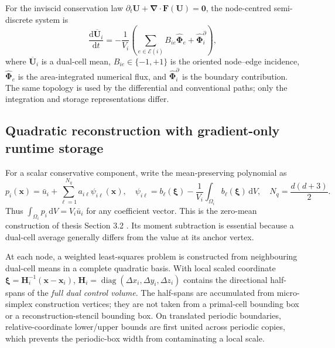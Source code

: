 \documentclass[11pt]{article}
\newcommand{\U}{\bm{U}}
\newcommand{\F}{\bm{F}}
\newcommand{\grad}{\bm{\nabla}}
\newcommand{\dd}{\mathrm{d}}
\begin{document}
For the inviscid conservation law $\partial_t\U+\grad\cdot\F(\U)=\bm{0}$, the node-centred semi-discrete system is
\begin{equation}
 \frac{\dd\overline{\U}_i}{\dd t}
 =-\frac{1}{V_i}\left(\sum_{e\in\mathcal{E}(i)}B_{ie}\widehat{\bm\Phi}_e
 +\widehat{\bm\Phi}^{\partial}_i\right),
 \label{eq:semidiscrete}
\end{equation}
where $\overline{\U}_i$ is a dual-cell mean, $B_{ie}\in\{-1,+1\}$ is the oriented node--edge incidence, $\widehat{\bm\Phi}_e$ is the area-integrated numerical flux, and $\widehat{\bm\Phi}^{\partial}_i$ is the boundary contribution.  The same topology is used by the differential and conventional paths; only the integration and storage representations differ.

\subsection{Quadratic reconstruction with gradient-only runtime storage}\label{sec:recon}

For a scalar conservative component, write the mean-preserving polynomial as
\begin{equation}
 p_i(\bm x)=\bar u_i+\sum_{\ell=1}^{N_q}a_{i\ell}\psi_{i\ell}(\bm x),
 \quad
 \psi_{i\ell}=b_\ell(\bm\xi)-\frac{1}{V_i}\int_{\Omega_i}b_\ell(\bm\xi)\,\dd V,
 \quad N_q=\frac{d(d+3)}{2}.
 \label{eq:zero-mean}
\end{equation}
Thus $\int_{\Omega_i}p_i\,\dd V=V_i\bar u_i$ for any coefficient vector.  This is the zero-mean construction of thesis Section 3.2 \cite{ma2026thesis}.  Its moment subtraction is essential because a dual-cell average generally differs from the value at its anchor vertex.

At each node, a weighted least-squares problem is constructed from neighbouring dual-cell means in a complete quadratic basis.  With local scaled coordinate $\bm\xi=\bm H_i^{-1}(\bm x-\bm x_i)$, $\bm H_i=\operatorname{diag}(\Delta x_i,\Delta y_i,\Delta z_i)$ contains the directional half-spans of the \emph{full dual control volume}.  The half-spans are accumulated from micro-simplex construction vertices; they are not taken from a primal-cell bounding box or a reconstruction-stencil bounding box.  On translated periodic boundaries, relative-coordinate lower/upper bounds are first united across periodic copies, which prevents the periodic-box width from contaminating a local scale.
\end{document}
